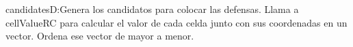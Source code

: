 
candidatesD:Genera los candidatos para colocar las defensas. Llama a cellValueRC para calcular el valor de cada celda junto con sus coordenadas en un vector. Ordena ese vector de mayor a menor.


